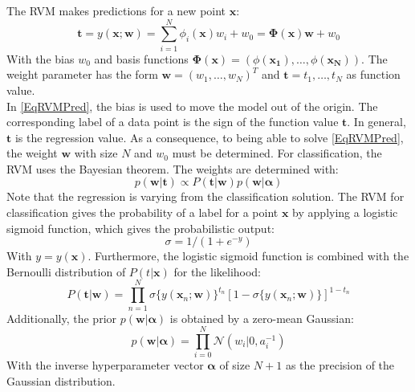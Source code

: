 The \ac{RVM} makes predictions for a new point $\mathbf{x}$:\cite[p. 211]{Tipping.2001}
\begin{equation}\label{EqRVMPred}
\mathbf{t} = y(\mathbf{x};\mathbf{w}) = \sum_{i=1}^{N}\phi_i(\mathbf{x})w_i + w_0 = \boldsymbol{\Phi}(\mathbf{x})\mathbf{w} + w_0
\end{equation}
With the bias $w_0$ and basis functions $\boldsymbol{\Phi}(\mathbf{x}) = (\phi(\mathbf{x_1}),\dots,\phi(\mathbf{x_N}))$.
The weight parameter has the form $\mathbf{w} = (w_1,\dots,w_N)^T$ and $\mathbf{t}={t_1,\dots,t_N}$ as function value.\\
In \eqref{EqRVMPred}, the bias is used to move the model out of the origin.
The corresponding label of a data point is the sign of the function value $\mathbf{t}$.
In general, $\mathbf{t}$ is the regression value. \cite[p. 662]{Theodoridis.2015} \newline
As a consequence, to being able to solve \eqref{EqRVMPred}, the weight $\mathbf{w}$ with size $N$ and $w_0$ must be determined.
For classification, the \acs{RVM} uses the Bayesian theorem. The weights are determined with: 
\begin{equation}\label{EqBayesInfeRVM}
p( \mathbf{w}\vert \mathbf{t} ) \propto P(\mathbf{t}\vert \mathbf{w}) p(\mathbf{w} \vert \boldsymbol{\alpha})
\end{equation}
Note that the regression is varying from the classification solution.
The \ac{RVM} for classification gives the probability of a label for a point $\mathbf{x}$ by applying a logistic sigmoid function, which gives the probabilistic output:
\begin{equation}\label{EqLogSig}
\sigma=1/(1+e^{-y}) 
\end{equation}
With $y=y(\mathbf{x})$. Furthermore, the logistic sigmoid function is combined with the Bernoulli distribution of $P(t\vert \mathbf{x})$ for the likelihood:
\begin{equation}\label{EqRVMLikelihood}
P(\mathbf{t}\vert\mathbf{w})=\prod_{n=1}^{N}\sigma\{y(\mathbf{x}_n;\mathbf{w})\}^{t_n}[1-\sigma\{y(\mathbf{x}_n;\mathbf{w})\}]^{1-t_n}
\end{equation}
Additionally, the prior $p(\mathbf{w} \vert \boldsymbol{\alpha})$ is obtained by a zero-mean Gaussian:
\begin{equation}\label{EqRVMPrior}
p(\mathbf{w} \vert \boldsymbol{\alpha}) = \prod_{i=0}^{N}\mathcal{N}(w_i\vert 0,a_i^{-1})
\end{equation}
With the inverse hyperparameter vector $\boldsymbol{\alpha}$ of size $N+1$ as the precision of the Gaussian distribution.

